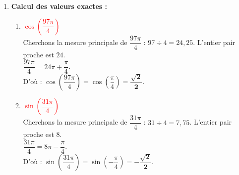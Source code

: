 \documentclass[12pt,a4paper]{article}
\begin{document}
\begin{enumerate}
\begin{enumerate}
        \item \textcolor{red}{$\alpha_4 = 40\pi$} \\
        $40\pi$ est un multiple pair de $\pi$ ($40\pi = 20 \times 2\pi$). \\
        La mesure principale est donc $\mathbf{0}$.
    \end{enumerate}

    \vspace{0.5cm}

    \item \textbf{Calcul des valeurs exactes :}
    
    \begin{enumerate}
        \item \textcolor{red}{$\cos \left( \dfrac{97\pi}{4} \right)$} \\
        Cherchons la mesure principale de $\dfrac{97\pi}{4}$ : $97 \div 4 = 24,25$. L'entier pair proche est $24$. \\
        $\dfrac{97\pi}{4} = 24\pi + \dfrac{\pi}{4}$. \\
        D'où : $\cos \left( \dfrac{97\pi}{4} \right) = \cos \left( \dfrac{\pi}{4} \right) = \mathbf{\dfrac{\sqrt{2}}{2}}$.
        
        \item \textcolor{red}{$\sin \left( \dfrac{31\pi}{4} \right)$} \\
        Cherchons la mesure principale de $\dfrac{31\pi}{4}$ : $31 \div 4 = 7,75$. L'entier pair proche est $8$. \\
        $\dfrac{31\pi}{4} = 8\pi - \dfrac{\pi}{4}$. \\
        D'où : $\sin \left( \dfrac{31\pi}{4} \right) = \sin \left( -\dfrac{\pi}{4} \right) = \mathbf{-\dfrac{\sqrt{2}}{2}}$.
    \end{enumerate}
\end{enumerate}
\end{document}
